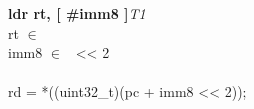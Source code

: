 


\begin{instructionblock}{\imagewidth}%
    \textbf{ldr rt, [ \#imm8 ]}\hfill\textit{T1}\\
    rt $\in$ \baseplus\\
    imm8 $\in$ \immEight\ {<}{<} 2\\
    {}\\
    rd = *((uint32\_t)(pc + imm8 {<}{<} 2));
\end{instructionblock}

